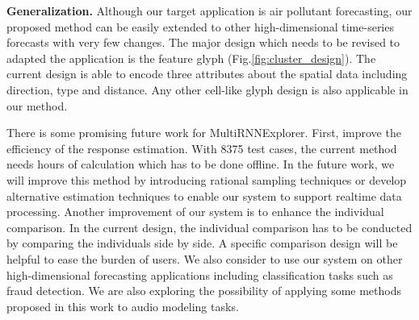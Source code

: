 \textbf{Generalization.}
Although our target application is air pollutant forecasting, our proposed method can be easily extended to other high-dimensional time-series forecasts with very few changes. The major design which needs to be revised to adapted the application is the feature glyph (Fig.\ref{fig:cluster_design}). The current design is able to encode three attributes about the spatial data including direction, type and distance. Any other cell-like glyph design is also applicable in our method. 


There is some promising future work for MultiRNNExplorer. First, improve the efficiency of the response estimation. With 8375 test cases, the current method needs hours of calculation which has to be done offline. 
In the future work, we will improve this method by introducing rational sampling techniques or develop alternative estimation techniques to enable our system to support realtime data processing. Another improvement of our system is to enhance the individual comparison. In the current design, the individual comparison has to be conducted by comparing the individuals side by side. A specific comparison design\cite{von2015mobilitygraphs} will be helpful to ease the burden of users. We also consider to use our system on other high-dimensional forecasting applications including classification tasks such as fraud detection\cite{jurgovsky2018sequence}. We are also exploring the possibility of applying some methods proposed in this work to audio modeling tasks. 

